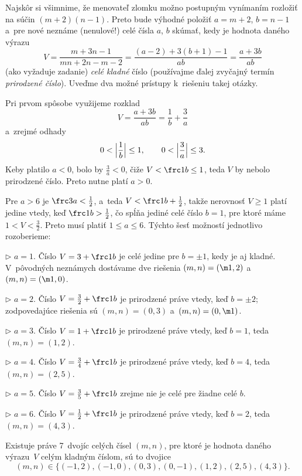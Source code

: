 {%
Najskôr si všimnime, že menovateľ zlomku možno postupným vynímaním rozložiť na súčin $(m+2)(n-1)$. Preto bude výhodné položiť $a=m+2$, $b=n-1$ a~pre nové neznáme (nenulové!) celé čísla $a$, $b$ skúmať, kedy je hodnota daného výrazu
$$
V=\frac{m+3n-1}{mn+2n-m-2}=\frac{(a-2)+3(b+1)-1}{ab}=\frac{a+3b}{ab}
$$
(ako vyžaduje zadanie) {\it celé kladné\/} číslo (používajme ďalej zvyčajný termín {\it prirodzené číslo\/}). Uveďme dva možné prístupy k~riešeniu takej otázky.

Pri prvom spôsobe využijeme rozklad
$$
V=\frac{a+3b}{ab}=\frac{1}{b}+\frac{3}{a}
$$
a~zrejmé odhady
$$
0<\Bigl|\frac1{b}\Bigr|\leq1,\qquad
0<\Bigl|\frac3{a}\Bigr|\leq3.
$$
Keby platilo $a<0$, bolo by $\frac3{a}<0$, čiže $V<\frc1{b}\leq1$, teda $V$ by nebolo prirodzené číslo. Preto nutne platí $a>0$.

Pre $a>6$ je $\frc3{a}<\frac12$, a~teda $V<\frc1b+\frac12$, takže nerovnosť $V\ge1$ platí jedine vtedy, keď $\frc1b>\frac12$, čo spĺňa jediné celé číslo $b=1$, pre ktoré máme $1<V<\frac32$. Preto musí platiť $1\le a\le6$. Týchto šesť možností jednotlivo rozoberieme:

{\smallskip
\item{$\triangleright$}
${a=1}$. Číslo $V=3+\frc1{b}$ je celé jedine pre $b=\pm1$, kedy je aj kladné. V~pôvodných neznámych dostávame dve riešenia $(m,n)=(\m1,2)$ a~$(m,n)=(\m1,0)$.

\parskip2pt
\item{$\triangleright$}
${a=2}$. Číslo $V=\frac32+\frc1{b}$ je prirodzené práve vtedy, keď $b=\pm2$; zodpovedajúce riešenia sú $(m,n)=(0,3)$ a~$(m,n)=(0,\m1)$.

\item{$\triangleright$}
${a=3}$. Číslo $V=1+\frc1{b}$ je prirodzené práve vtedy, keď $b=1$, teda $(m,n)=(1,2)$.

\item{$\triangleright$}
${a=4}$. Číslo $V=\frac34+\frc1{b}$ je prirodzené práve vtedy, keď $b=4$, teda $(m,n)=(2,5)$.

\item{$\triangleright$}
${a=5}$. Číslo $V=\frac35+\frc1{b}$ zrejme nie je celé pre žiadne celé $b$.

\item{$\triangleright$}
${a=6}$. Číslo $V=\frac12+\frc1{b}$ je prirodzené práve vtedy, keď $b=2$, teda $(m,n)=(4,3)$.
}

\odpoved
Existuje práve 7~dvojíc celých čísel $(m,n)$, pre ktoré je hodnota daného výrazu~$V$ celým kladným číslom,
sú to dvojice
$$
(m,n)\in\{(-1,2),(-1,0),(0,3),(0,-1),(1,2),(2,5),(4,3)\}.
$$

}
